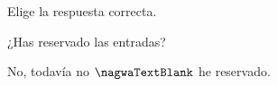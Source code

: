 
\begin{question}

\begin{instance}
    
\begin{mcq}[standalone=false]
      
\begin{stem}
        Elige la respuesta correcta.\par
        
\begin{enumerationnolabel}
          \item{¿Has reservado las entradas?}          
          \item{No, todavía no $\nagwaTextBlank$  he reservado.}        
\end{enumerationnolabel}
      
\end{stem}
      
\begin{distractors}
\end{distractors}
                      
\end{mcq}
  
\end{instance}

\end{question}
